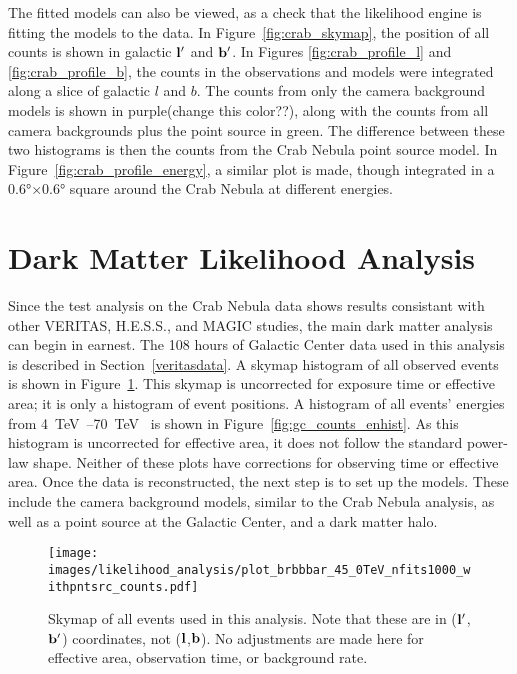   The fitted models can also be viewed, as a check that the likelihood engine is fitting the models to the data.
  In Figure~\ref{fig:crab_skymap}, the position of all counts is shown in galactic $\mathbf{l'}$ and $\mathbf{b'}$.
  In Figures \ref{fig:crab_profile_l} and \ref{fig:crab_profile_b}, the counts in the observations and models were integrated along a slice of galactic $l$ and $b$.
  The counts from only the camera background models is shown in purple{\color{red}(change this color??)}, along with the counts from all camera backgrounds plus the point source in green.
  The difference between these two histograms is then the counts from the Crab Nebula point source model.
  In Figure~\ref{fig:crab_profile_energy}, a similar plot is made, though integrated in a \ang{0.6}$\times$\ang{0.6} square around the Crab Nebula at different energies.

  \FloatBarrier

\section{Dark Matter Likelihood Analysis}\label{sec:dmlike}
  
  Since the test analysis on the Crab Nebula data shows results consistant with other VERITAS, H.E.S.S., and MAGIC studies, the main dark matter analysis can begin in earnest.
  The 108 hours of Galactic Center data used in this analysis is described in Section~\ref{veritasdata}.
  A skymap histogram of all observed events is shown in Figure~\ref{fig:gc_counts_skymap}.
  This skymap is uncorrected for exposure time or effective area; it is only a histogram of event positions.
  A histogram of all events' energies from \SIrange{4}{70}{\TeV{}} is shown in Figure~\ref{fig:gc_counts_enhist}.
  As this histogram is uncorrected for effective area, it does not follow the standard power-law shape.
  Neither of these plots have corrections for observing time or effective area.
  Once the data is reconstructed, the next step is to set up the models.
  These include the camera background models, similar to the Crab Nebula analysis, as well as a point source at the Galactic Center, and a dark matter halo.
  
  \begin{figure}[!ht]
    \centering
    \texttt{[image: images/likelihood\_analysis/plot\_brbbbar\_45\_0TeV\_nfits1000\_withpntsrc\_counts.pdf]}
    \caption[Galactic Center Counts Skymap]{
      Skymap of all events used in this analysis.
      Note that these are in ($\mathbf{l'}$,$\mathbf{b'}$) coordinates, not ($\mathbf{l }$,$\mathbf{b }$).
      No adjustments are made here for effective area, observation time, or background rate.
    }
    \label{fig:gc_counts_skymap}
  \end{figure}
  
